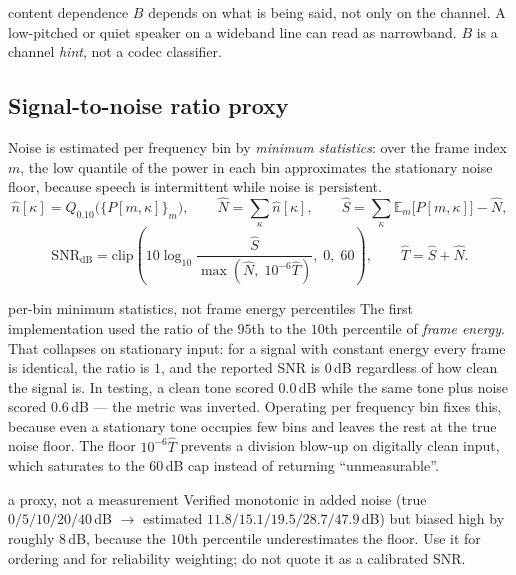 \documentclass[11pt,a4paper]{article}
\newcommand{\Ex}{\mathbb{E}}
\begin{document}
\begin{warnbox}{content dependence}
$B$ depends on what is being said, not only on the channel. A low-pitched or quiet
speaker on a wideband line can read as narrowband. $B$ is a channel \emph{hint}, not a
codec classifier.
\end{warnbox}

\subsection{Signal-to-noise ratio proxy}

Noise is estimated per frequency bin by \emph{minimum statistics}: over the frame index
$m$, the low quantile of the power in each bin approximates the stationary noise floor,
because speech is intermittent while noise is persistent.
\begin{equation}
\hat n[\kappa] = Q_{0.10}\big(\{P[m,\kappa]\}_m\big),
\qquad
\hat N = \sum_\kappa \hat n[\kappa],
\qquad
\hat S = \sum_\kappa \Ex_m\big[P[m,\kappa]\big] - \hat N,
\end{equation}
\begin{equation}
\mathrm{SNR}_{\mathrm{dB}} = \mathrm{clip}\!\left(10\log_{10}\frac{\hat S}{\max(\hat N,\; 10^{-6}\hat T)},\; 0,\; 60\right),
\qquad \hat T = \hat S + \hat N .
\end{equation}

\begin{whybox}{per-bin minimum statistics, not frame energy percentiles}
The first implementation used the ratio of the $95$th to the $10$th percentile of
\emph{frame energy}. That collapses on stationary input: for a signal with constant
energy every frame is identical, the ratio is $1$, and the reported SNR is $0$\,dB
regardless of how clean the signal is. In testing, a clean tone scored $0.0$\,dB while
the same tone plus noise scored $0.6$\,dB --- the metric was inverted. Operating per
frequency bin fixes this, because even a stationary tone occupies few bins and leaves
the rest at the true noise floor. The floor $10^{-6}\hat T$ prevents a division blow-up
on digitally clean input, which saturates to the $60$\,dB cap instead of returning
``unmeasurable''.
\end{whybox}

\begin{warnbox}{a proxy, not a measurement}
Verified monotonic in added noise (true $0/5/10/20/40$\,dB $\to$ estimated
$11.8/15.1/19.5/28.7/47.9$\,dB) but biased high by roughly $8$\,dB, because the $10$th
percentile underestimates the floor. Use it for ordering and for reliability weighting;
do not quote it as a calibrated SNR.
\end{warnbox}
\end{document}
